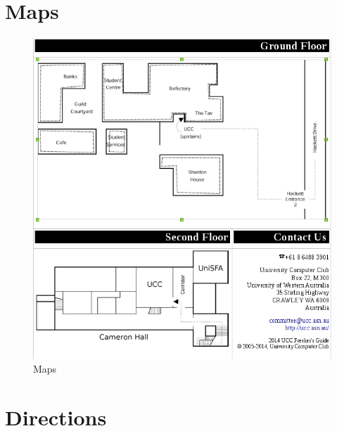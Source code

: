 \label{FindClubroom}



\section{Maps}


\begin{figure}[H]
	\centering
	\includegraphics[width=1\textwidth]{figures/maps.png}
	\caption{Maps} 
	\label{maps.png}
\end{figure}

\pagebreak

\section{Directions}

